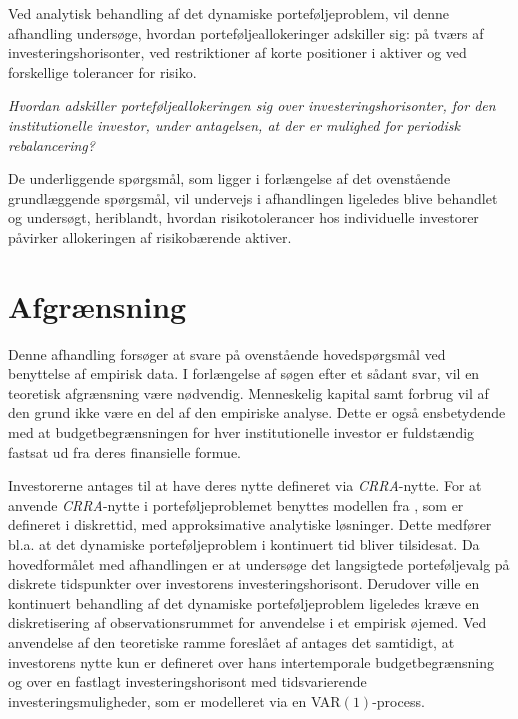\documentclass[
  a4paper,
  oneside]{memoir}
\begin{document}
Ved analytisk behandling af det dynamiske porteføljeproblem, vil denne afhandling undersøge, hvordan porteføljeallokeringer adskiller sig: på tværs af investeringshorisonter, ved restriktioner af korte positioner i aktiver og ved forskellige tolerancer for risiko.

\begin{center}
\textit{Hvordan adskiller porteføljeallokeringen sig over investeringshorisonter, for den institutionelle investor, under antagelsen, at der er mulighed for periodisk rebalancering?}
\end{center}

De underliggende spørgsmål, som ligger i forlængelse af det ovenstående grundlæggende spørgsmål, vil undervejs i afhandlingen ligeledes blive behandlet og undersøgt, heriblandt, hvordan risikotolerancer hos individuelle investorer påvirker allokeringen af risikobærende aktiver.

\hypertarget{afgruxe6nsning}{%
\section{Afgrænsning}\label{afgruxe6nsning}}

Denne afhandling forsøger at svare på ovenstående hovedspørgsmål ved benyttelse af empirisk data. I forlængelse af søgen efter et sådant svar, vil en teoretisk afgrænsning være nødvendig. Menneskelig kapital samt forbrug vil af den grund ikke være en del af den empiriske analyse. Dette er også ensbetydende med at budgetbegrænsningen for hver institutionelle investor er fuldstændig fastsat ud fra deres finansielle formue.

Investorerne antages til at have deres nytte defineret via \emph{CRRA}-nytte. For at anvende \emph{CRRA}-nytte i porteføljeproblemet benyttes modellen fra \citep{JurVic2011}, som er defineret i diskrettid, med approksimative analytiske løsninger. Dette medfører bl.a. at det dynamiske porteføljeproblem i kontinuert tid bliver tilsidesat. Da hovedformålet med afhandlingen er at undersøge det langsigtede porteføljevalg på diskrete tidspunkter over investorens investeringshorisont. Derudover ville en kontinuert behandling af det dynamiske porteføljeproblem ligeledes kræve en diskretisering af observationsrummet for anvendelse i et empirisk øjemed. Ved anvendelse af den teoretiske ramme foreslået af \citep{JurVic2011} antages det samtidigt, at investorens nytte kun er defineret over hans intertemporale budgetbegrænsning og over en fastlagt investeringshorisont med tidsvarierende investeringsmuligheder, som er modelleret via en VAR\((1)\)-process.
\end{document}

